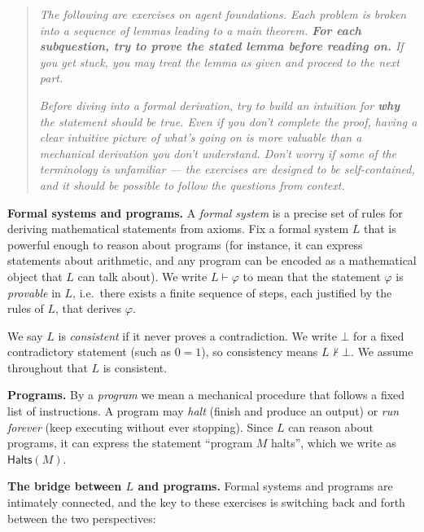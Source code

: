 \documentclass[11pt]{article}
\begin{document}
\begin{quote}
    \textit{The following are exercises on agent foundations. Each problem is broken into a sequence of lemmas leading to a main theorem. \textbf{For each subquestion, try to prove the stated lemma before reading on.} If you get stuck, you may treat the lemma as given and proceed to the next part.}

    \medskip
    \textit{Before diving into a formal derivation, try to build an intuition for \textbf{why} the statement should be true. Even if you don't complete the proof, having a clear intuitive picture of what's going on is more valuable than a mechanical derivation you don't understand. Don't worry if some of the terminology is unfamiliar --- the exercises are designed to be self-contained, and it should be possible to follow the questions from context.}
\end{quote}
\noindent
\textbf{Formal systems and programs.} A \emph{formal system} is a precise set of rules for
deriving mathematical statements from axioms. Fix a formal system $L$ that is powerful
enough to reason about programs (for instance, it can express statements about
arithmetic, and any program can be encoded as a mathematical object that $L$ can talk
about). We write $L \vdash \varphi$ to mean that the statement $\varphi$ is
\emph{provable} in $L$, i.e.\ there exists a finite sequence of steps, each justified by
the rules of $L$, that derives $\varphi$.

\medskip
\noindent
We say $L$ is \emph{consistent} if it never proves a contradiction. We write $\bot$ for
a fixed contradictory statement (such as $0 = 1$), so consistency means $L \nvdash \bot$.
We assume throughout that $L$ is consistent.

\medskip
\noindent
\textbf{Programs.} By a \emph{program} we mean a mechanical procedure that follows a
fixed list of instructions. A program may \emph{halt} (finish and produce an output)
or \emph{run forever} (keep executing without ever stopping). Since $L$ can reason about
programs, it can express the statement ``program $M$ halts'', which we write as
$\mathsf{Halts}(M)$.

\medskip
\noindent
\textbf{The bridge between $L$ and programs.} Formal systems and programs are
intimately connected, and the key to these exercises is switching back and forth between
the two perspectives:
\end{document}
